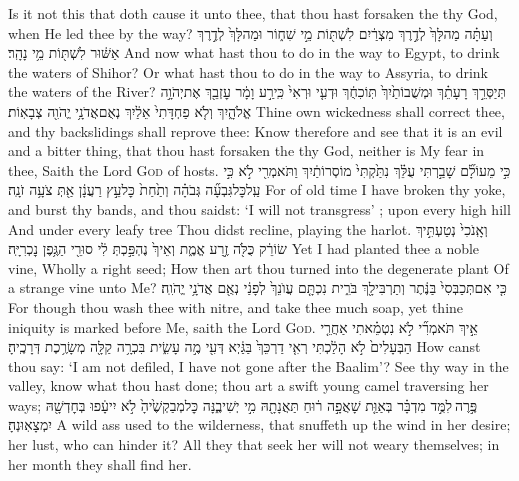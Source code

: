 {Is it not this that doth cause it unto thee, that thou hast forsaken the \lord\space thy God, when He led thee by the way?}
{וְעַתָּ֗ה מַה\maqqaf לָּךְ֙ לְדֶ֣רֶךְ מִצְרַ֔יִם לִשְׁתּ֖וֹת מֵ֣י שִׁח֑וֹר וּמַה\maqqaf לָּךְ֙ לְדֶ֣רֶךְ אַשּׁ֔וּר לִשְׁתּ֖וֹת מֵ֥י נָהָֽר׃}
{And now what hast thou to do in the way to Egypt, to drink the waters of Shihor? Or what hast thou to do in the way to Assyria, to drink the waters of the River?}
{תְּיַסְּרֵ֣ךְ רָעָתֵ֗ךְ וּמְשֻׁבוֹתַ֙יִךְ֙ תּֽוֹכִחֻ֔ךְ וּדְעִ֤י וּרְאִי֙ כִּֽי\maqqaf רַ֣ע וָמָ֔ר עׇזְבֵ֖ךְ אֶת\maqqaf יְהֹוָ֣ה אֱלֹהָ֑יִךְ וְלֹ֤א פַחְדָּתִי֙ אֵלַ֔יִךְ נְאֻם\maqqaf אֲדֹנָ֥י יֱהֹוִ֖ה צְבָאֽוֹת׃}
{Thine own wickedness shall correct thee, and thy backslidings shall reprove thee: Know therefore and see that it is an evil and a bitter thing, that thou hast forsaken the \lord\space thy God, neither is My fear in thee, Saith the Lord \textsc{God} of hosts.}
{כִּ֣י מֵעוֹלָ֞ם שָׁבַ֣רְתִּי עֻלֵּ֗ךְ נִתַּ֙קְתִּי֙ מוֹסְרוֹתַ֔יִךְ וַתֹּאמְרִ֖י לֹ֣א  כִּ֣י עַֽל\maqqaf כׇּל\maqqaf גִּבְעָ֞ה גְּבֹהָ֗ה וְתַ֙חַת֙ כׇּל\maqqaf עֵ֣ץ רַעֲנָ֔ן אַ֖תְּ צֹעָ֥ה זֹנָֽה׃}
{For of old time I have broken thy yoke, and burst thy bands, and thou saidst: ‘I will not transgress’ ; upon every high hill And under every leafy tree Thou didst recline, playing the harlot.}
{וְאָֽנֹכִי֙ נְטַעְתִּ֣יךְ שׂוֹרֵ֔ק כֻּלֹּ֖ה זֶ֣רַע אֱמֶ֑ת וְאֵיךְ֙ נֶהְפַּ֣כְתְּ לִ֔י סוּרֵ֖י הַגֶּ֥פֶן נׇכְרִיָּֽה׃}
{Yet I had planted thee a noble vine, Wholly a right seed; How then art thou turned into the degenerate plant Of a strange vine unto Me?}
{כִּ֤י אִם\maqqaf תְּכַבְּסִי֙ בַּנֶּ֔תֶר וְתַרְבִּי\maqqaf לָ֖ךְ בֹּרִ֑ית נִכְתָּ֤ם עֲוֺנֵךְ֙ לְפָנַ֔י נְאֻ֖ם אֲדֹנָ֥י יֱהֹוִֽה׃}
{For though thou wash thee with nitre, and take thee much soap, yet thine iniquity is marked before Me, saith the Lord \textsc{God}.}
{אֵ֣יךְ תֹּאמְרִ֞י לֹ֣א נִטְמֵ֗אתִי אַחֲרֵ֤י הַבְּעָלִים֙ לֹ֣א הָלַ֔כְתִּי רְאִ֤י דַרְכֵּךְ֙ בַּגַּ֔יְא דְּעִ֖י מֶ֣ה עָשִׂ֑ית בִּכְרָ֥ה קַלָּ֖ה מְשָׂרֶ֥כֶת דְּרָכֶֽיהָ׃}
{How canst thou say: ‘I am not defiled, I have not gone after the Baalim’? See thy way in the valley, know what thou hast done; thou art a swift young camel traversing her ways;}
{פֶּ֣רֶה \legarmeh  לִמֻּ֣ד מִדְבָּ֗ר בְּאַוַּ֤ת  שָׁאֲפָ֣ה ר֔וּחַ תַּאֲנָתָ֖הּ מִ֣י יְשִׁיבֶ֑נָּה כׇּל\maqqaf מְבַקְשֶׁ֙יהָ֙ לֹ֣א יִיעָ֔פוּ בְּחׇדְשָׁ֖הּ יִמְצָאֽוּנְהָ׃}
{A wild ass used to the wilderness, that snuffeth up the wind in her desire; her lust, who can hinder it? All they that seek her will not weary themselves; in her month they shall find her.}
